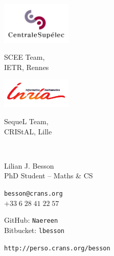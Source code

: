\documentclass[10pt]{article}
\begin{document}
\raggedright
\begin{multicols}{2}
    \includegraphics[width=0.25\textwidth]{cslogo}%

    \tiny{SCEE Team,\\
          IETR, Rennes}

\columnbreak
\raggedleft
    \includegraphics[width=0.25\textwidth]{inrialogo}%

    \tiny{SequeL Team,\\
          CRIStAL, Lille}
\end{multicols}
\centering\\[-35pt]
\parbox{2.5in}{
    \Large \centering Lilian J. Besson\\[2pt]
    \normalsize PhD Student -- Maths \& CS\\
}
\vfill
\raggedright
\begin{small}
\begin{multicols}{2}
    \texttt{besson@crans.org}\\
    $+33 \; 6 \; 28 \; 41 \; 22 \; 57$%

\columnbreak
\raggedleft
    GitHub: \texttt{Naereen}\\
    Bitbucket: \texttt{lbesson}%
\end{multicols}%
\end{small}
\begin{center}
    \texttt{http://perso.crans.org/besson}
\end{center}
\end{document}
